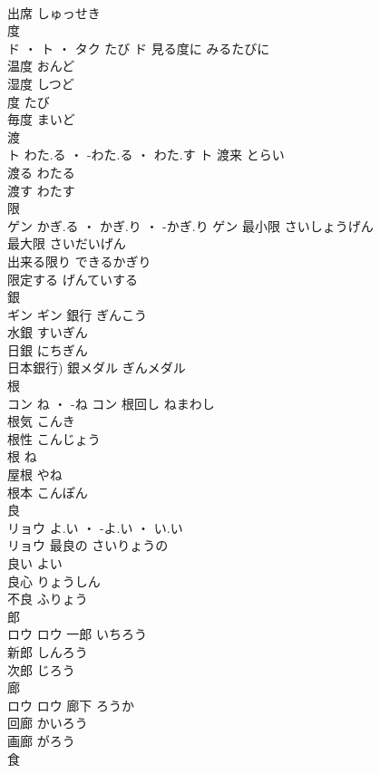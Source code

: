 \documentclass[8pt]{extreport}
\begin{document}
\begin{CJK}{UTF8}{min}
\\	出席	しゅっせき	
\\	度	
\\	ド ・ ト ・ タク	たび	ド	見る度に	みるたびに	
\\	温度	おんど	
\\	湿度	しつど	
\\	度	たび	
\\	毎度	まいど	
\\	渡	
\\	ト	わた.る ・ -わた.る ・ わた.す	ト	渡来	とらい	
\\	渡る	わたる	
\\	渡す	わたす	
\\	限	
\\	ゲン	かぎ.る ・ かぎ.り ・ -かぎ.り	ゲン	最小限	さいしょうげん	
\\	最大限	さいだいげん	
\\	出来る限り	できるかぎり	
\\	限定する	げんていする	
\\	銀	
\\	ギン		ギン	銀行	ぎんこう	
\\	水銀	すいぎん	
\\	日銀	にちぎん	
\\	日本銀行)	銀メダル	ぎんメダル	
\\	根	
\\	コン	ね ・ -ね	コン	根回し	ねまわし	
\\	根気	こんき	
\\	根性	こんじょう	
\\	根	ね	
\\	屋根	やね	
\\	根本	こんぽん	
\\	良	
\\	リョウ	よ.い ・ -よ.い ・ い.い
\\	リョウ	最良の	さいりょうの	
\\	良い	よい	
\\	良心	りょうしん	
\\	不良	ふりょう	
\\	郎	
\\	ロウ		ロウ	一郎	いちろう	
\\	新郎	しんろう	
\\	次郎	じろう	
\\	廊	
\\	ロウ		ロウ	廊下	ろうか	
\\	回廊	かいろう	
\\	画廊	がろう	
\\	食	

\end{CJK}
\end{document}
